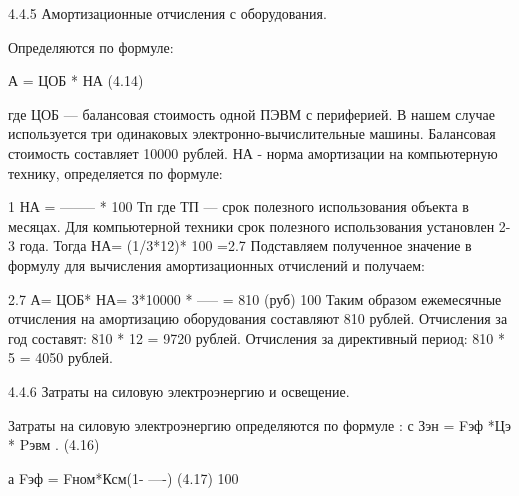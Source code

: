 \begin{ESKDexplanation}
\begin{ESKDexplanation}
\begin{ESKDexplanation}
\begin{ESKDexplanation}
4.4.5    Амортизационные  отчисления  с  оборудования.

Определяются по формуле:


                                       А = ЦОБ * НА                                                                    (4.14)                                   

где ЦОБ — балансовая стоимость одной ПЭВМ с периферией. В нашем случае
используется три одинаковых электронно-вычислительные машины. 
Балансовая стоимость составляет 10000 рублей.
НА -      норма амортизации на компьютерную технику, определяется по формуле:

                                                    1
                                      НА = -------- * 100%
                                                   Тп
где ТП — срок полезного использования объекта в месяцах.
Для компьютерной техники срок полезного использования установлен 2-3 года.
Тогда НА= (1/3*12)* 100 =2.7
Подставляем полученное значение в формулу для вычисления амортизационных отчислений и получаем:

                                                               2.7
                    А= ЦОБ* НА= 3*10000  * -----   =   810 (руб)
                                                               100
Таким образом ежемесячные отчисления на амортизацию оборудования
составляют 810 рублей.
Отчисления за год составят:   810 * 12 = 9720 рублей.
Отчисления за директивный период:  810 * 5 = 4050 рублей.

 4.4.6  Затраты на силовую электроэнергию и освещение.
            
Затраты на силовую электроэнергию определяются по формуле :
                                        с
                                       Зэн = Fэф  *Цэ  * Pэвм .                                                (4.16)

                                                                             а                                          
                                       Fэф = Fном*Ксм(1-   ----)                                              (4.17)                                                                                    
                                                                           100                                                                                                                                                                                                                                                                                                                                                                         
                                       

\end{ESKDexplanation}
\end{ESKDexplanation}
\end{ESKDexplanation}
\end{ESKDexplanation}

